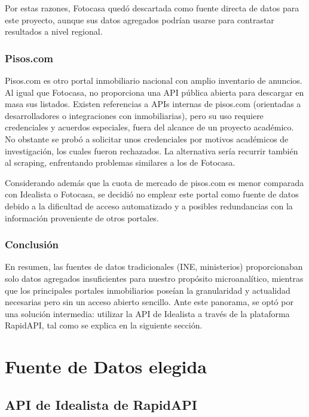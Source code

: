 \documentclass[a4paper,11pt]{book}
\begin{document}
Por estas razones, Fotocasa quedó descartada como fuente directa de datos para este proyecto, aunque sus datos agregados podrían usarse para contrastar resultados a nivel regional.

\subsubsection{Pisos.com}
Pisos.com es otro portal inmobiliario nacional con amplio inventario de anuncios. Al igual que Fotocasa, no proporciona una API pública abierta para descargar en masa sus listados. Existen referencias a APIs internas de pisos.com (orientadas a desarrolladores o integraciones con inmobiliarias), pero su uso requiere credenciales y acuerdos especiales, fuera del alcance de un proyecto académico. No obstante se probó a solicitar unos credenciales por motivos académicos de investigación, los cuales fueron rechazados. La alternativa sería recurrir también al scraping, enfrentando problemas similares a los de Fotocasa. 

Considerando además que la cuota de mercado de pisos.com es menor comparada con Idealista o Fotocasa, se decidió no emplear este portal como fuente de datos debido a la dificultad de acceso automatizado y a posibles redundancias con la información proveniente de otros portales.

\subsubsection{Conclusión}
En resumen, las fuentes de datos tradicionales (INE, ministerios) proporcionaban solo datos agregados insuficientes para nuestro propósito microanalítico, mientras que los principales portales inmobiliarios poseían la granularidad y actualidad necesarias pero sin un acceso abierto sencillo. Ante este panorama, se optó por una solución intermedia: utilizar la API de Idealista a través de la plataforma RapidAPI, tal como se explica en la siguiente sección.

\section{Fuente de Datos elegida}

\subsection{API de Idealista de RapidAPI}
\end{document}
